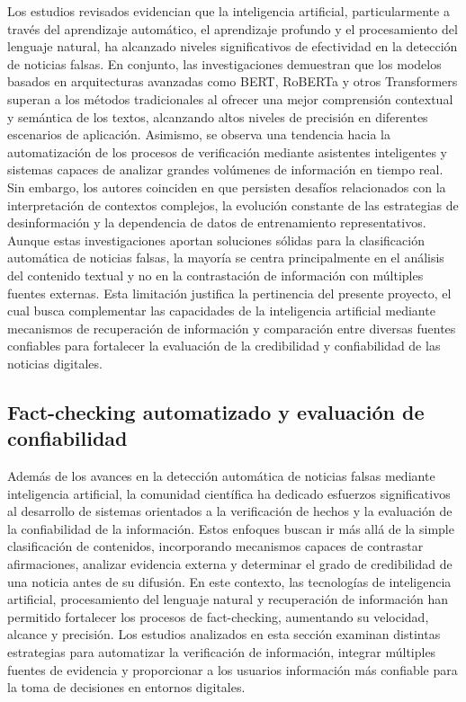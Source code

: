 \documentclass[12pt]{article}
\begin{document}
Los estudios revisados evidencian que la inteligencia artificial, particularmente a través del aprendizaje automático, el aprendizaje profundo y el procesamiento del lenguaje natural, ha alcanzado niveles significativos de efectividad en la detección de noticias falsas. En conjunto, las investigaciones demuestran que los modelos basados en arquitecturas avanzadas como BERT, RoBERTa y otros Transformers superan a los métodos tradicionales al ofrecer una mejor comprensión contextual y semántica de los textos, alcanzando altos niveles de precisión en diferentes escenarios de aplicación. Asimismo, se observa una tendencia hacia la automatización de los procesos de verificación mediante asistentes inteligentes y sistemas capaces de analizar grandes volúmenes de información en tiempo real. Sin embargo, los autores coinciden en que persisten desafíos relacionados con la interpretación de contextos complejos, la evolución constante de las estrategias de desinformación y la dependencia de datos de entrenamiento representativos. Aunque estas investigaciones aportan soluciones sólidas para la clasificación automática de noticias falsas, la mayoría se centra principalmente en el análisis del contenido textual y no en la contrastación de información con múltiples fuentes externas. Esta limitación justifica la pertinencia del presente proyecto, el cual busca complementar las capacidades de la inteligencia artificial mediante mecanismos de recuperación de información y comparación entre diversas fuentes confiables para fortalecer la evaluación de la credibilidad y confiabilidad de las noticias digitales.

\subsection{Fact-checking automatizado y evaluación de confiabilidad}

Además de los avances en la detección automática de noticias falsas mediante inteligencia artificial, la comunidad científica ha dedicado esfuerzos significativos al desarrollo de sistemas orientados a la verificación de hechos y la evaluación de la confiabilidad de la información. Estos enfoques buscan ir más allá de la simple clasificación de contenidos, incorporando mecanismos capaces de contrastar afirmaciones, analizar evidencia externa y determinar el grado de credibilidad de una noticia antes de su difusión. En este contexto, las tecnologías de inteligencia artificial, procesamiento del lenguaje natural y recuperación de información han permitido fortalecer los procesos de fact-checking, aumentando su velocidad, alcance y precisión. Los estudios analizados en esta sección examinan distintas estrategias para automatizar la verificación de información, integrar múltiples fuentes de evidencia y proporcionar a los usuarios información más confiable para la toma de decisiones en entornos digitales. 
\end{document}

